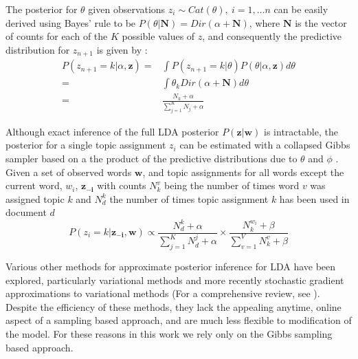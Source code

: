The posterior for $\theta$ given observations $z_i \sim Cat(\theta),~i = 1, \ldots n$ can be easily derived using Bayes' rule to be $P(\theta | \boldsymbol{N}) = Dir(\alpha + \boldsymbol{N})$, where $\boldsymbol{N}$ is the vector of counts for each of the $K$ possible values of $z$, and consequently the predictive distribution for $z_{n+1}$ is given by \citep{BishopCh2}:
\begin{equation}
\begin{split}
P(z_{n+1}=k | \alpha, \boldsymbol{z}) =& \int P(z_{n+1}=k | \theta) P(\theta | \alpha, \boldsymbol{z}) d\theta\\
=& \int \theta_k Dir(\alpha + \boldsymbol{N}) d\theta\\
=& \frac{N_k + \alpha}{\sum_{j=1}^K N_j + \alpha}
\end{split}
\end{equation}

Although exact inference of the full LDA posterior $P(\boldsymbol{z} | \boldsymbol{w})$ is intractable, the posterior for a single topic assignment $z_i$ can be estimated with a  collapsed Gibbs sampler based on a the product of the predictive distributions due to $\theta$ and $\phi$ \citep{griffiths2004}. Given a set of observed words $\textbf{w}$, and topic assignments for all words except the current word, $w_i$, $\boldsymbol{z_{-i}}$ with counts $N^v_k$ being the number of times word $v$ was assigned topic $k$ and $N^k_d$ the number of times topic assignment $k$ has been used in document $d$
\begin{equation} \label{eqn:posterior}
P(z_i = k | \boldsymbol{z_{-i}}, \boldsymbol{w}) \propto \frac{N^k_d + \alpha}{\sum_{j=1}^K N^j_d + \alpha} \times
   \frac{N^{w_i}_k + \beta}{\sum_{v=1}^V N^v_k + \beta}
\end{equation}

Various other methods for approximate posterior inference for LDA have been explored, particularly variational methods and more recently stochastic gradient approximations to variational methods (For a comprehensive review, see \citep{geigle2016}). Despite the efficiency of these methods, they lack the appealing anytime, online aspect of a sampling based approach, and are much less flexible to modification of the model. For these reasons in this work we rely only on the Gibbs sampling based approach.

